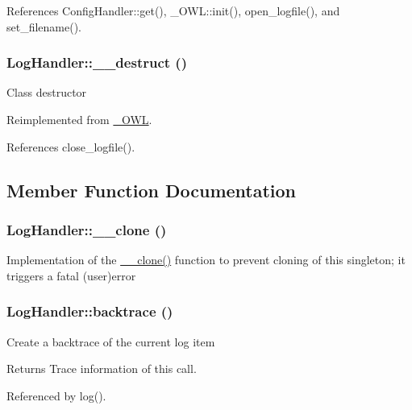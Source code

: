 References ConfigHandler::get(), \_\-OWL::init(), open\_\-logfile(), and set\_\-filename().

\subsubsection[{\_\-\_\-destruct}]{\setlength{\rightskip}{0pt plus 5cm}LogHandler::\_\-\_\-destruct ()}\label{classLogHandler_aacd0c653489cf221423b9edd62e81458}
Class destructor 

Reimplemented from \hyperlink{class__OWL_a44fd2222476a3109286cc82d92b6bbcc}{\_\-OWL}.



References close\_\-logfile().



\subsection{Member Function Documentation}
\subsubsection[{\_\-\_\-clone}]{\setlength{\rightskip}{0pt plus 5cm}LogHandler::\_\-\_\-clone ()}\label{classLogHandler_a395099dd9f1e9794bfe6a0c771991c3c}
Implementation of the \hyperlink{classLogHandler_a395099dd9f1e9794bfe6a0c771991c3c}{\_\-\_\-clone()} function to prevent cloning of this singleton; it triggers a fatal (user)error 
\subsubsection[{backtrace}]{\setlength{\rightskip}{0pt plus 5cm}LogHandler::backtrace ()}\label{classLogHandler_a441d505d1dfb81bd86dc1d3c53600552}
Create a backtrace of the current log item

\begin{DoxyReturn}{Returns}
Trace information of this call. 
\end{DoxyReturn}


Referenced by log().


